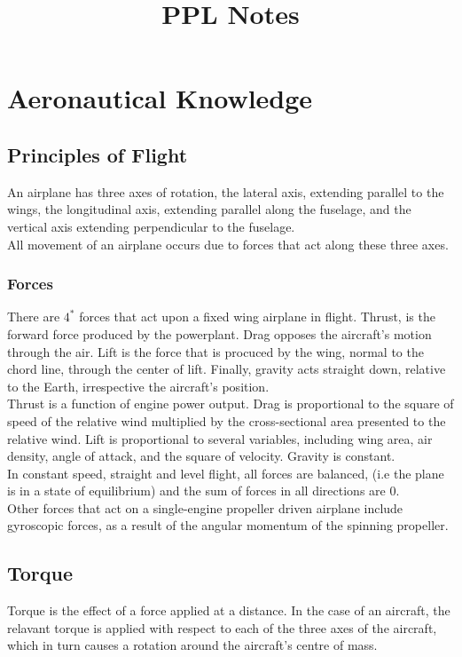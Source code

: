\documentclass[12pt]{article}
\title{PPL Notes}
\date{}
\begin{document}
\maketitle
\tableofcontents
\newpage
\section{Aeronautical Knowledge}
	\subsection{Principles of Flight}
		An airplane has three axes of rotation, the lateral axis, extending parallel to the wings, the longitudinal axis, extending parallel along the fuselage, and the vertical axis extending perpendicular to the fuselage. \\

		All movement of an airplane occurs due to forces that act along these three axes.
		\subsubsection{Forces}
			There are $4^*$ forces that act upon a fixed wing airplane in flight. Thrust, is the forward force produced by the powerplant. Drag opposes the aircraft's motion through the air. Lift is the force that is procuced by the wing, normal to the chord line, through the center of lift. Finally, gravity acts straight down, relative to the Earth, irrespective the aircraft's position.\\

			Thrust is a function of engine power output. Drag is proportional to the square of speed of the relative wind multiplied by the cross-sectional area presented to the relative wind. Lift is proportional to several variables, including wing area, air density, angle of attack, and the square of velocity. Gravity is constant.\\

			In constant speed, straight and level flight, all forces are balanced, (i.e the plane is in a state of equilibrium) and the sum of forces in all directions are 0.\\

			Other forces that act on a single-engine propeller driven airplane include gyroscopic forces, as a result of the angular momentum of the spinning propeller.

		\subsection{Torque}
			Torque is the effect of a force applied at a distance. In the case of an aircraft, the relavant torque is applied with respect to each of the three axes of the aircraft, which in turn causes a rotation around the aircraft's centre of mass.
\end{document}
